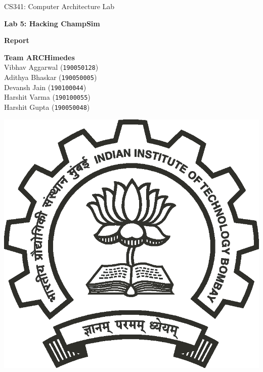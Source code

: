 \documentclass[11pt, swedish, openany]{book}
\begin{document}

\begin{titlepage}
    \clearpage\thispagestyle{empty}
    \centering
    \vspace{2cm}

    {\large CS341: Computer Architecture Lab\par}
    \vspace{4cm}
    {\Huge \textbf{Lab 5: Hacking ChampSim}} \\
    \vspace{0.2cm}
    {\huge \textbf{Report} \par}
    \vspace{4cm}
    {\normalsize {\large \textbf{Team ARCHimedes}}\\
        Vibhav Aggarwal (\texttt{190050128}) \\
        Adithya Bhaskar (\texttt{190050005}) \\
        Devansh Jain (\texttt{190100044}) \\
        Harshit Varma (\texttt{190100055}) \\
        Harshit Gupta (\texttt{190050048})
        \par}
    \vspace{2cm}
    \vfill

    \includegraphics[scale=0.30]{iitb_logo/iitb_logo.eps}


\end{titlepage}
\end{document}
